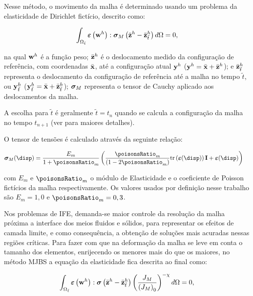 \documentclass[tese_patricia]{subfiles}
\begin{document}
Nesse método, o movimento da malha é determinado usando um problema da elasticidade de Dirichlet fictício, descrito como:

\begin{align}
	\int_{\Omega_{\tilde{t}}} \bm{\varepsilon} \left(\mathbf{w}^h\right) : \boldsymbol{\sigma}_M \left(\bar{\mathbf{z}}^h - \bar{\mathbf{z}}^h_{\tilde{t}}\right) d\Omega = 0,
	\label{eq:elasticityequation}
\end{align}


\noindent na qual $\mathbf{w}^h$ é a função peso; $\bar{\mathbf{z}}^h$ é o deslocamento medido da configuração de referência, com coordenadas $\bar{\mathbf{x}}$, até a configuração atual $\mathbf{y}^h$ ($\mathbf{y}^h = \bar{\mathbf{x}} +\bar{\mathbf{z}}^h $); e 
$\bar{\mathbf{z}}^h_{\tilde{t}}$ representa o deslocamento da configuração de referência até a malha no tempo ${\tilde{t}}$, ou $\mathbf{y}^h_{\tilde{t}}$ ($\mathbf{y}^h_{\tilde{t}} = \bar{\mathbf{x}} + \bar{\mathbf{z}}^h_{\tilde{t}}$); $\boldsymbol{\sigma}_M$ representa o tensor de Cauchy aplicado aos deslocamentos da malha.

A escolha para ${\tilde{t}}$ é geralmente ${\tilde{t}} = {t_{n}}$ quando se calcula a configuração da malha no tempo ${t_{n+1}}$ (ver  para maiores detalhes). 

O tensor de tensões é calculado através da seguinte relação:

\begin{align}
	\stresstensor_M(\disp)
	&=
	\frac{E_m}{1+\poisonsRatio_m}
	\left(
	\frac{\poisonsRatio_m}{(1 - 2 \poisonsRatio_m)}
	\trace\left(\straintensor(\disp)\right)\unittensor
	+
	\straintensor(\disp)
	\right)
\end{align}

\noindent com $E_m$ e $\poisonsRatio_m$ o módulo de Elasticidade e o coeficiente de Poisson fictícios da malha respectivamente. Os valores usados por definição nesse trabalho são $E_m=1,0$ e $\poisonsRatio_m = 0,3$.

Nos problemas de IFE, demanda-se maior controle da resolução da malha próxima a interface dos meios fluidos e sólidos, para representar os efeitos de camada limite, e como consequência, a obtenção de soluções mais acuradas nessas regiões críticas. Para fazer com que na deformação da malha se leve em conta o tamanho dos elementos, enrijecendo os menores mais do que os maiores, no método MJBS a equação da elasticidade fica descrita ao final como:

\begin{align}
	\int_{\Omega_{\tilde{t}}} \bm{\varepsilon} \left(\mathbf{w}^h\right) : \boldsymbol{\sigma} \left(\bar{\mathbf{z}}^h- \bar{\mathbf{z}}^h_{\tilde{t}}\right) \left(\frac{J_M}{\left({J_M}\right)_0}\right)^{-\chi} d\Omega = 0, 
	\label{eq:MJBS}
\end{align}
\end{document}
